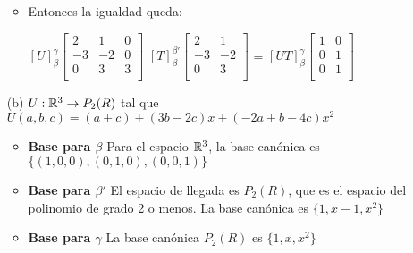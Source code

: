 \begin{itemize}
\begin{itemize}
        \item Entonces la igualdad queda:
        \begin{center}
            $ \left[ U \right]_{\beta}^{\gamma}
            \begin{bmatrix}
                2  &  1  & 0 \\
               -3  & -2  & 0 \\
                0  &  3  & 3 \\
            \end{bmatrix}      
            $
            $ \left[ T \right]_{\beta}^{\beta'}
            \begin{bmatrix}
                2  &  1 \\
               -3  & -2 \\
                0  &  3 \\
            \end{bmatrix}      
            $
            =
            $ \left[ UT \right]_{\beta}^{\gamma}
            \begin{bmatrix}
                1  &  0 \\
                0  &  1 \\
                0  &  1 \\
            \end{bmatrix}      
            $
        \end{center}
     \end{itemize}
    
    \item[(b)] $U: \mathbb{R}^{3} \rightarrow P_{2}(R)$ tal que $U(a,b,c) = (a + c) + (3b - 2c)x + (-2a + b -4c)x^{2}$
    \begin{itemize}
        \item \textbf{Base para $\beta$} Para el espacio $\mathbb{R}^{3}$, la base canónica es $\{ (1,0,0),(0,1,0),(0,0,1) \}$                
        \item \textbf{Base para $\beta'$} El espacio de llegada es $P_{2}(R)$, que es el espacio del polinomio de grado 2 o menos. La base canónica es $\{ 1,x-1,x^{2} \}$        
        \item \textbf{Base para $\gamma$} La base canónica $P_{2}(R)$ es $\{ 1,x,x^{2} \}$                
    \end{itemize}


\end{itemize}
